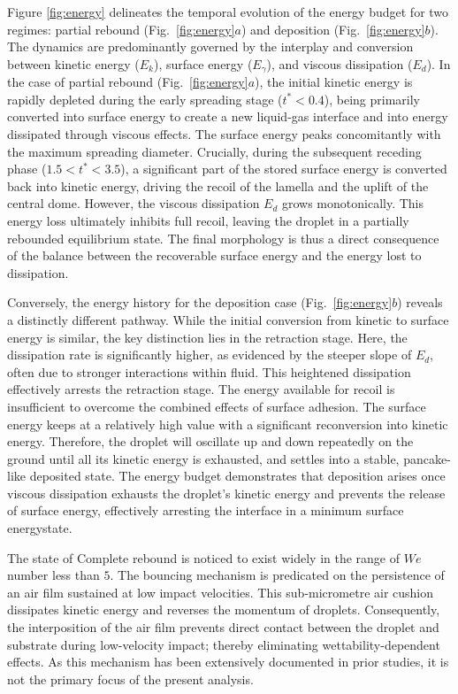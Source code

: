 \documentclass[lineno]{cls/jfm}
\begin{document}
 Figure \ref{fig:energy} delineates the temporal evolution of the energy budget for two regimes: partial rebound (Fig.~\ref{fig:energy}$a$) and deposition (Fig.~\ref{fig:energy}$b$). The dynamics are predominantly governed by the interplay and conversion between kinetic energy ($E_k$), surface energy ($E_\gamma$), and viscous dissipation ($E_d$). In the case of partial rebound (Fig.~\ref{fig:energy}$a$), the initial kinetic energy is rapidly depleted during the early spreading stage ($t^* < 0.4$), being primarily converted into surface energy to create a new liquid-gas interface and into energy dissipated through viscous effects. The surface energy peaks concomitantly with the maximum spreading diameter. Crucially, during the subsequent receding phase ($1.5 < t^* < 3.5$), a significant part of the stored surface energy is converted back into kinetic energy, driving the recoil of the lamella and the uplift of the central dome. However, the viscous dissipation $E_d$ grows monotonically. This energy loss ultimately inhibits full recoil, leaving the droplet in a partially rebounded equilibrium state. The final morphology is thus a direct consequence of the balance between the recoverable surface energy and the energy lost to dissipation.

 Conversely, the energy history for the deposition case (Fig.~\ref{fig:energy}$b$) reveals a distinctly different pathway. While the initial conversion from kinetic to surface energy is similar, the key distinction lies in the retraction stage. Here, the dissipation rate is significantly higher, as evidenced by the steeper slope of $E_d$, often due to stronger interactions within fluid. This heightened dissipation effectively arrests the retraction stage. The energy available for recoil is insufficient to overcome the combined effects of surface adhesion. The surface energy keeps at a relatively high value with a significant reconversion into kinetic energy. Therefore, the droplet will oscillate up and down repeatedly on the ground until all its kinetic energy is exhausted, and settles into a stable, pancake-like deposited state. The energy budget demonstrates that deposition arises once viscous dissipation exhausts the droplet's kinetic energy and prevents the release of surface energy, effectively arresting the interface in a minimum surface energystate.


 The state of Complete rebound is noticed to exist widely in the range of $We$ number less than $5$. The bouncing mechanism is predicated on the persistence of an air film sustained at low impact velocities. This sub-micrometre air cushion dissipates kinetic energy and reverses the momentum of droplets. Consequently, the interposition of the air film prevents direct contact between the droplet and substrate during low-velocity impact; thereby eliminating wettability-dependent effects. As this mechanism has been extensively documented in prior studies, it is not the primary focus of the present analysis.
\end{document}
